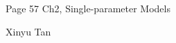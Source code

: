 \documentclass{article}
\begin{document}
\large %


{\Large Page 57 %
\hfill  Ch2, Single-parameter Models}

\begin{center}
{\Large Xinyu Tan} %
\end{center}
\vspace{0.05in}

 \renewcommand{\labelitemi}{$\textendash$}
\end{document}
